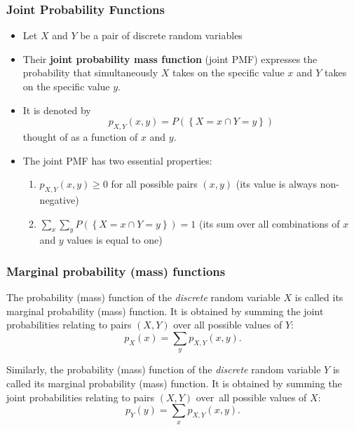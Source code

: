 \documentclass[notes=show,handout]{beamer}
\newenvironment{stepenumerate}{\begin{enumerate}[<+->]}{\end{enumerate}}
\newenvironment{stepitemize}{\begin{itemize}[<+->]}{\end{itemize} }
\renewcommand{\Pr}{P}
\begin{document}
\begin{frame}
\frametitle{Joint Probability Functions}

\begin{stepitemize}
\item Let $X$ and $Y$ be a pair of discrete random variables

\item Their  \textbf{joint probability mass function} (joint
PMF) expresses the probability that simultaneously $X$ takes on the specific
value $x$ and $Y$ takes on the specific value $y$.

\item It is denoted by 
\begin{equation*}
p_{X,Y}\left( x,y\right) =\Pr (\left\{ X=x\cap Y=y\right\})
\end{equation*}
thought of as a function of $x$ and $y$.

\item The joint PMF has two essential properties:

\begin{stepenumerate}
\item $p_{X,Y}\left( x,y\right) \geq 0$ for all possible pairs $\left(
x,y\right) $ (its value is always non-negative)

\item $\sum_{x}\sum_{y}\Pr ( \left\{ X=x\cap Y=y\right\}) =1$ (its sum over all
combinations of $x$ and $y$ values is equal to one)
\end{stepenumerate}
\end{stepitemize}

\end{frame}%

\begin{frame}%
\frametitle{Marginal probability (mass) functions}

\begin{definition}
The probability (mass) function of the \emph{discrete} random variable 
$X$ is called its marginal probability (mass) function. It is obtained by summing the joint probabilities relating to pairs $%
(X,Y)$ over all possible values of $Y$:%
\begin{equation*}
p_{X}(x)=\sum_{y}p_{X,Y}(x,y).
\end{equation*}

Similarly, the probability (mass) function of the \emph{discrete}
random variable $Y$ is called its marginal probability (mass) function. It is obtained by summing the joint probabilities relating to pairs $%
(X,Y)$ over\emph{\ }all possible values of $X$:%
\begin{equation*}
p_{Y}(y)=\sum_{x}p_{X,Y}(x,y).
\end{equation*}
\end{definition}
\end{frame}%
\end{document}
